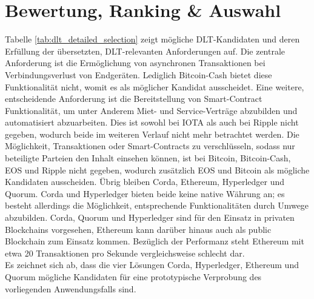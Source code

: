 %
%
\section{Bewertung, Ranking \& Auswahl}
\label{sec:dlt_selection:rating}
Tabelle \ref{tab:dlt_detailed_selection} zeigt mögliche \ac{DLT}-Kandidaten und deren Erfüllung der übersetzten, \ac{DLT}-relevanten Anforderungen auf. Die zentrale Anforderung ist die Ermöglichung von asynchronen Transaktionen bei Verbindungsverlust von Endgeräten. Lediglich Bitcoin-Cash bietet diese Funktionalität nicht, womit es als möglicher Kandidat ausscheidet. Eine weitere, entscheidende Anforderung ist die Bereitstellung von Smart-Contract Funktionalität, um unter Anderem Miet- und Service-Verträge abzubilden und automatisiert abzuarbeiten. Dies ist sowohl bei IOTA als auch bei Ripple nicht gegeben, wodurch beide im weiteren Verlauf nicht mehr betrachtet werden. Die Möglichkeit, Transaktionen oder Smart-Contracts zu verschlüsseln, sodass nur beteiligte Parteien den Inhalt einsehen können, ist bei Bitcoin, Bitcoin-Cash, EOS und Ripple nicht gegeben, wodurch zusätzlich EOS und Bitcoin als mögliche Kandidaten ausscheiden. Übrig bleiben Corda, Ethereum, Hyperledger und Quorum. Corda und Hyperledger bieten beide keine native Währung an; es besteht allerdings die Möglichkeit, entsprechende Funktionalitäten durch Umwege abzubilden. Corda, Quorum und Hyperledger sind für den Einsatz in privaten Blockchains vorgesehen, Ethereum kann darüber hinaus auch als public Blockchain zum Einsatz kommen. Bezüglich der Performanz steht Ethereum mit etwa 20 Transaktionen pro Sekunde vergleichsweise schlecht dar.\\
Es zeichnet sich ab, dass die vier Lösungen Corda, Hyperledger, Ethereum und Quorum mögliche Kandidaten für eine prototypische Verprobung des vorliegenden Anwendungsfalls sind.
